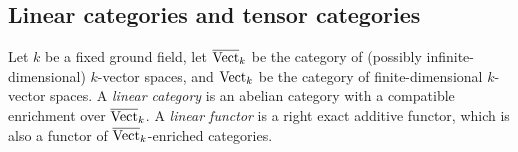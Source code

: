 \documentclass{amsart}
\begin{document}





\subsection{Linear categories and tensor categories} \label{sec:tc-lincat}

	Let $k$ be a fixed ground field, let $\overline{\mathrm{Vect}}_k$ be the category of (possibly infinite-dimensional) $k$-vector spaces, and $\mathrm{Vect}_k$ be the category of finite-dimensional $k$-vector spaces.   A {\em linear category} is an abelian category with a compatible enrichment over $\overline{\mathrm{Vect}}_k$. 
A {\em linear functor} is a right exact additive functor, which is also a functor of $\overline{\mathrm{Vect}}_k$-enriched categories. 
\end{document}
